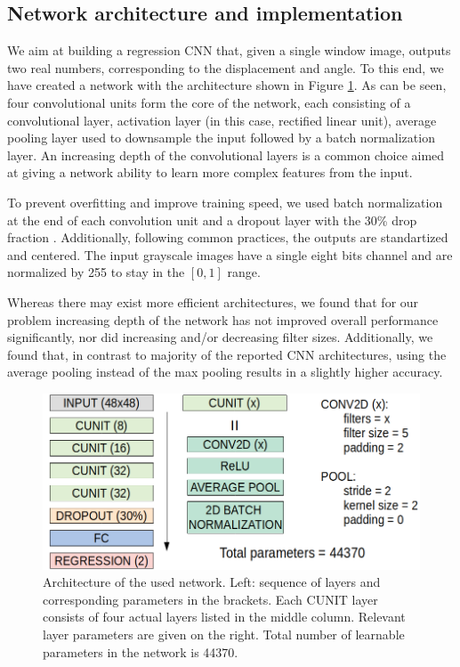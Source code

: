 \documentclass{svjour3}                     %
\begin{document}
\subsection{Network architecture and implementation}

We aim at building a regression CNN that, given a single window image, outputs two real numbers, corresponding to the displacement and angle. To this end, we have created a network with the architecture shown in Figure \ref{fig:figcnn}. As can be seen, four convolutional units form the core of the network, each consisting of a convolutional layer, activation layer (in this case, rectified linear unit), average pooling layer used to downsample the input followed by a batch normalization layer. An increasing depth of the convolutional layers is a common choice aimed at giving a network ability to learn more complex features from the input. 

To prevent overfitting and improve training speed, we used batch normalization at the end of each convolution unit \cite{ioffe2015batch} and a dropout layer with the 30\% drop fraction \cite{srivastava2014dropout}. Additionally, following common practices, the outputs are standartized and centered. The input grayscale images have a single eight bits channel and are normalized by 255 to stay in the $[0, 1]$ range.

Whereas there may exist more efficient architectures, we found that for our problem increasing depth of the network has not improved overall performance significantly, nor did increasing and/or decreasing filter sizes. Additionally, we found that, in contrast to majority of the reported CNN architectures, using the average pooling instead of the max pooling results in a slightly higher accuracy.

\begin{figure}
\includegraphics[width=\textwidth]{figs/figure_CNN.png}
\caption{Architecture of the used network. Left: sequence of layers and corresponding parameters in the brackets. Each CUNIT layer consists of four actual layers listed in the middle column. Relevant layer parameters are given on the right. Total number of learnable parameters in the network is 44370.}
\label{fig:figcnn}
\end{figure}
\end{document}
